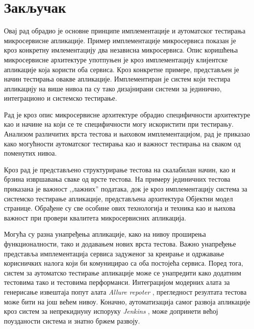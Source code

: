 \documentclass[12pt,oneside]{memoir}
\begin{document}
\chapter{Закључак}
\label{chp:zakljucak}

Овај рад обрадио је основне принципе имплементације и аутоматског тестирања микросервисне апликације. Пример имплементације микросервиса показан је кроз конкретну имлементацију два независна микросервиса. Опис коришћења микросервисне архитектуре употпуњен је кроз имплементацију клијентске апликације која користи оба сервиса. Кроз конкретне примере, представљен је начин тестирања овакве апликације. Имплементиран је систем који тестира апликацију на више нивоа па су тако дизајнирани системи за јединично, интеграционо и системско тестирање.

Рад је кроз опис микросервисне архитектуре обрадио специфичности архитектуре као и начине на који се те специфичности могу искористити при тестирању. Анализом различитих врста тестова и њиховом имплементацијом, рад је приказао како могућности аутоматског тестирања као и важност тестирања на сваком од поменутих нивоа. 

Кроз рад је представљено структурирање тестова на скалабилан начин, као и брзина извршавања сваке од врсте тестова. На примеру јединичних тестова приказана је важност ,,лажних” података, док је кроз имплементацију система за системско тестирање апликације, представљена архитектура Објектни модел странице. Обрађене су све особине ових технологија и техника као и њихова важност при провери квалитета микросервисних апликација.

Могућа су разна унапређења апликације, како на нивоу проширења функционалности, тако и додавањем нових врста тестова. Важно унапређење представља имплементација сервиса задуженог за креирање и одржавање корисничких налога који би комуницирао са оба постојећа сервиса. Поред тога, систем за аутоматско тестирање апликације може се унапредити како додатним тестовима тако и тестовима перформанси. Интеграцијом модерних алата за генерисање извештаја попут алата \textit{Allure repoter} \cite{allure}, прегледност резултата тестова може бити на још већем нивоу. Коначно, аутоматизација самог развоја апликације кроз систем за непрекиднуну испоруку \textit{Jenkins} \cite{jenkins}, може допринети већој поузданости система и знатно бржем развоју.
\end{document}

